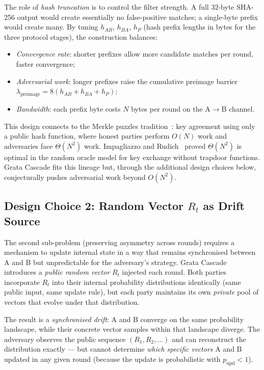 \documentclass[11pt,a4paper]{article}
\begin{document}
The role of \emph{hash truncation} is to control the filter strength. A full $32$-byte SHA-256 output would create essentially no false-positive matches; a single-byte prefix would create many. By tuning $h_{AB}$, $h_{BA}$, $h_P$ (hash prefix lengths in bytes for the three protocol stages), the construction balances:
\begin{itemize}[leftmargin=*]
\item \emph{Convergence rate}: shorter prefixes allow more candidate matches per round, faster convergence;
\item \emph{Adversarial work}: longer prefixes raise the cumulative preimage barrier $\lambda_\text{preimage} = 8(h_{AB} + h_{BA} + h_P)$;
\item \emph{Bandwidth}: each prefix byte costs $N$ bytes per round on the A$\to$B channel.
\end{itemize}

This design connects to the Merkle puzzles tradition~\cite{Merkle1978}: key agreement using only a public hash function, where honest parties perform $O(N)$ work and adversaries face $\Theta(N^2)$ work. Impagliazzo and Rudich~\cite{IR1989} proved $\Theta(N^2)$ is optimal in the random oracle model for key exchange without trapdoor functions. Grata Cascade fits this lineage but, through the additional design choices below, conjecturally pushes adversarial work beyond $O(N^2)$.

\subsection{Design Choice 2: Random Vector $R_t$ as Drift Source}

The second sub-problem (preserving asymmetry across rounds) requires a mechanism to update internal state in a way that remains synchronised between A and B but unpredictable for the adversary's strategy. Grata Cascade introduces a \emph{public random vector} $R_t$ injected each round. Both parties incorporate $R_t$ into their internal probability distributions identically (same public input, same update rule), but each party maintains its own \emph{private} pool of vectors that evolve under that distribution.

The result is a \emph{synchronised drift}: A and B converge on the same probability landscape, while their concrete vector samples within that landscape diverge. The adversary observes the public sequence $(R_1, R_2, \ldots)$ and can reconstruct the distribution exactly --- but cannot determine \emph{which specific vectors} A and B updated in any given round (because the update is probabilistic with $p_\text{upd} < 1$).
\end{document}
